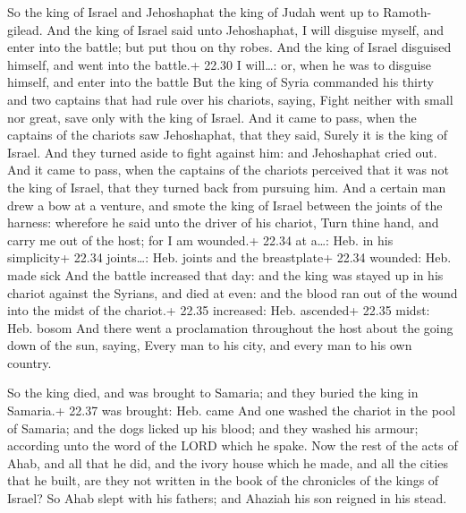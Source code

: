  So the king of Israel and Jehoshaphat the king of Judah
went up to Ramoth-gilead.  And the king of Israel said unto
Jehoshaphat, I will disguise myself, and enter into the battle; but put
thou on thy robes. And the king of Israel disguised himself, and went
into the battle.+ 22.30 I will\ldots: or, when he was to disguise
himself, and enter into the battle  But the king of Syria
commanded his thirty and two captains that had rule over his chariots,
saying, Fight neither with small nor great, save only with the king of
Israel.  And it came to pass, when the captains of the
chariots saw Jehoshaphat, that they said, Surely it is the king of
Israel. And they turned aside to fight against him: and Jehoshaphat
cried out.  And it came to pass, when the captains of the
chariots perceived that it was not the king of Israel, that they turned
back from pursuing him.  And a certain man drew a bow at a
venture, and smote the king of Israel between the joints of the harness:
wherefore he said unto the driver of his chariot, Turn thine hand, and
carry me out of the host; for I am wounded.+ 22.34 at a\ldots: Heb. in
his simplicity+ 22.34 joints\ldots: Heb. joints and the breastplate+
22.34 wounded: Heb. made sick  And the battle increased
that day: and the king was stayed up in his chariot against the Syrians,
and died at even: and the blood ran out of the wound into the midst of
the chariot.+ 22.35 increased: Heb. ascended+ 22.35 midst: Heb. bosom
 And there went a proclamation throughout the host about
the going down of the sun, saying, Every man to his city, and every man
to his own country.

 So the king died, and was brought to Samaria; and they
buried the king in Samaria.+ 22.37 was brought: Heb. came 
And one washed the chariot in the pool of Samaria; and the dogs licked
up his blood; and they washed his armour; according unto the word of the
LORD which he spake.  Now the rest of the acts of Ahab, and
all that he did, and the ivory house which he made, and all the cities
that he built, are they not written in the book of the chronicles of the
kings of Israel?  So Ahab slept with his fathers; and
Ahaziah his son reigned in his stead.

